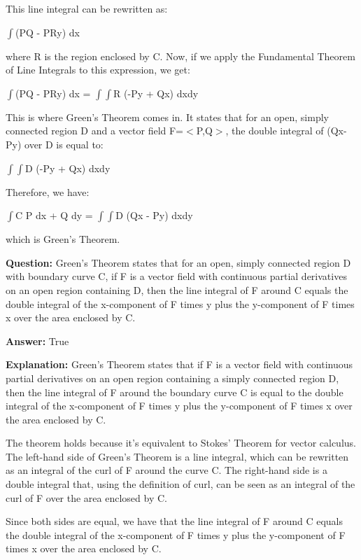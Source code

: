 \documentclass{article}
\begin{document}
This line integral can be rewritten as:

\ensuremath{\int}(PQ - PRy) dx

where R is the region enclosed by C. Now, if we apply the Fundamental Theorem of Line Integrals to this expression, we get:

\ensuremath{\int}(PQ - PRy) dx = \ensuremath{\int}\ensuremath{\int}R (-Py + Qx) dxdy

This is where Green's Theorem comes in. It states that for an open, simply connected region D and a vector field F=\ensuremath{<}P,Q\ensuremath{>}, the double integral of (Qx-Py) over D is equal to:

\ensuremath{\int}\ensuremath{\int}D (-Py + Qx) dxdy

Therefore, we have:

\ensuremath{\int}C P dx + Q dy = \ensuremath{\int}\ensuremath{\int}D (Qx - Py) dxdy

which is Green's Theorem.
                
                \vspace{0.5cm} 
        
            
                \textbf {Question:} Green's Theorem states that for an open, simply connected region D with boundary curve C, if F is a vector field with continuous partial derivatives on an open region containing D, then the line integral of F around C equals the double integral of the x-component of F times y plus the y-component of F times x over the area enclosed by C.
                
                \textbf{Answer:} True

                \textbf{Explanation:} Green's Theorem states that if F is a vector field with continuous partial derivatives on an open region containing a simply connected region D, then the line integral of F around the boundary curve C is equal to the double integral of the x-component of F times y plus the y-component of F times x over the area enclosed by C.

The theorem holds because it's equivalent to Stokes' Theorem for vector calculus. The left-hand side of Green's Theorem is a line integral, which can be rewritten as an integral of the curl of F around the curve C. The right-hand side is a double integral that, using the definition of curl, can be seen as an integral of the curl of F over the area enclosed by C.

Since both sides are equal, we have that the line integral of F around C equals the double integral of the x-component of F times y plus the y-component of F times x over the area enclosed by C.
                
\end{document}
